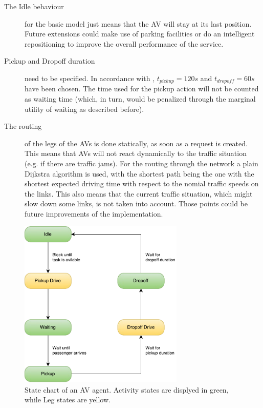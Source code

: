 \begin{description}
\item[The Idle behaviour] for the basic model just means that the AV will stay at
its last position. Future extensions could make use of parking facilities or do
an intelligent repositioning to improve the overall performance of the service.
\item[Pickup and Dropoff duration] need to be specified. In accordance with
, $t_{pickup} = 120s$ and $t_{dropoff} = 60s$ have been chosen. The time
used for the pickup action will not be counted as waiting time (which, in turn,
would be penalized through the marginal utility of waiting as described before).
\item[The routing] of the legs of the AVs is done statically, as soon as a request
is created. This means that AVs will not react dynamically to the traffic situation
(e.g. if there are traffic jams). For the routing through the network a plain
Dijkstra algorithm is used, with the shortest path being the one with the shortest
expected driving time with respect to the nomial traffic speeds on the links. This
also means that the current traffic situation, which might slow down some links,
is not taken into account. Those points could be future improvements of the
implementation.
\end{description}

\begin{figure}
    \centering
    \includegraphics[width=0.7\textwidth]{figures/avstates.pdf}
    \caption{State chart of an AV agent. Activity states are displyed in green, while Leg states are yellow.}
    \label{fig:avstates}
\end{figure}

